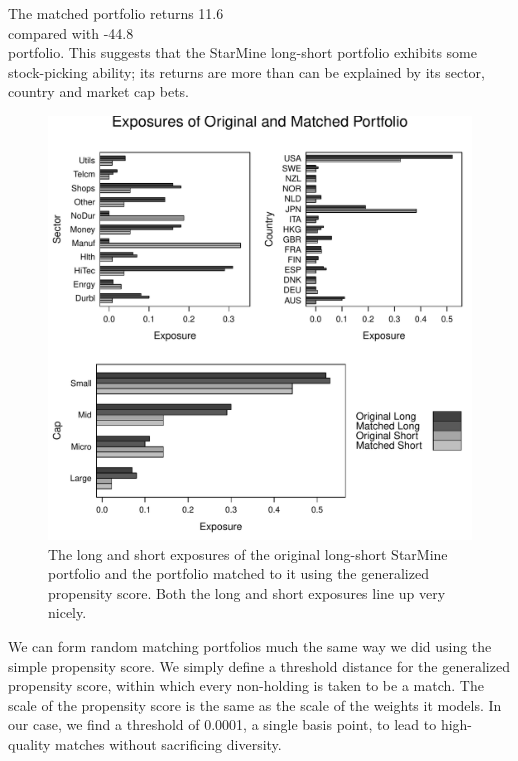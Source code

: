 \documentclass{article}\usepackage{graphicx, color}
\makeatletter
\def\maxwidth{ %
  \ifdim\Gin@nat@width>\linewidth
    \linewidth
  \else
    \Gin@nat@width
  \fi
}
\newenvironment{knitrout}{}{} %
\makeatother
\begin{document}
The matched portfolio returns 11.6\\%
compared with -44.8\\%
portfolio. This suggests that the StarMine long-short portfolio
exhibits some stock-picking ability; its returns are more than can be
explained by its sector, country and market cap bets.

\begin{figure}
\begin{center}
\begin{knitrout}
\color{fgcolor}
\includegraphics[width=\maxwidth]{figure/unnamed-chunk-18} 

\end{knitrout}

\end{center}
\caption{The long and short exposures of the original long-short
  StarMine portfolio and the portfolio matched to it using the
  generalized propensity score. Both the long and short exposures line
  up very nicely.}
\label{FigureLSMatchExposure}
\end{figure}

We can form random matching portfolios much the same way we did using
the simple propensity score. We simply define a threshold distance for
the generalized propensity score, within which every non-holding is
taken to be a match. The scale of the propensity score is the same as
the scale of the weights it models. In our case, we find a threshold
of 0.0001, a single basis point, to lead to high-quality matches
without sacrificing diversity.
\end{document}
